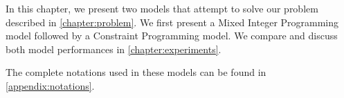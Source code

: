 \documentclass[../../thesis.tex]{subfiles}
\begin{document}
In this chapter, we present two models that attempt to solve our problem described in \autoref{chapter:problem}.
We first present 
a Mixed Integer Programming model followed by a Constraint Programming model.
We compare and discuss both model performances in \autoref{chapter:experiments}.

The complete notations used in these models can be found in \autoref{appendix:notations}.
\end{document}
